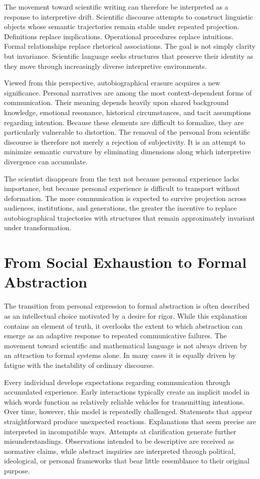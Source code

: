 \documentclass[11pt]{article}
\theoremstyle{plain}
\begin{document}
The movement toward scientific writing can therefore be interpreted as a response to interpretive drift. Scientific discourse attempts to construct linguistic objects whose semantic trajectories remain stable under repeated projection. Definitions replace implications. Operational procedures replace intuitions. Formal relationships replace rhetorical associations. The goal is not simply clarity but invariance. Scientific language seeks structures that preserve their identity as they move through increasingly diverse interpretive environments.

Viewed from this perspective, autobiographical erasure acquires a new significance. Personal narratives are among the most context-dependent forms of communication. Their meaning depends heavily upon shared background knowledge, emotional resonance, historical circumstances, and tacit assumptions regarding intention. Because these elements are difficult to formalize, they are particularly vulnerable to distortion. The removal of the personal from scientific discourse is therefore not merely a rejection of subjectivity. It is an attempt to minimize semantic curvature by eliminating dimensions along which interpretive divergence can accumulate.

The scientist disappears from the text not because personal experience lacks importance, but because personal experience is difficult to transport without deformation. The more communication is expected to survive projection across audiences, institutions, and generations, the greater the incentive to replace autobiographical trajectories with structures that remain approximately invariant under transformation.

\section{From Social Exhaustion to Formal Abstraction}

The transition from personal expression to formal abstraction is often described as an intellectual choice motivated by a desire for rigor. While this explanation contains an element of truth, it overlooks the extent to which abstraction can emerge as an adaptive response to repeated communicative failures. The movement toward scientific and mathematical language is not always driven by an attraction to formal systems alone. In many cases it is equally driven by fatigue with the instability of ordinary discourse.

Every individual develops expectations regarding communication through accumulated experience. Early interactions typically create an implicit model in which words function as relatively reliable vehicles for transmitting intentions. Over time, however, this model is repeatedly challenged. Statements that appear straightforward produce unexpected reactions. Explanations that seem precise are interpreted in incompatible ways. Attempts at clarification generate further misunderstandings. Observations intended to be descriptive are received as normative claims, while abstract inquiries are interpreted through political, ideological, or personal frameworks that bear little resemblance to their original purpose.
\end{document}
